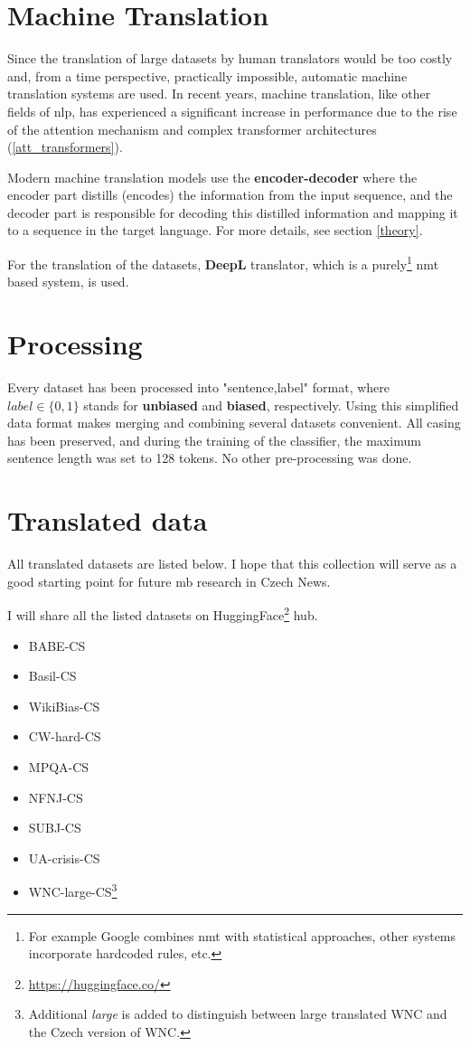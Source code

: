  
 
\section{Machine Translation}\label{DeepL}
Since the translation of large datasets by human translators would be too costly and, from a time perspective, practically impossible, automatic machine translation systems are used. In recent years, machine translation, like other fields of \Gls{nlp}, has experienced a significant increase in performance due to the rise of the attention mechanism and complex transformer architectures (\ref{att_transformers}).

Modern machine translation models use the \textbf{encoder-decoder} where the encoder part distills (encodes) the information from the input sequence, and the decoder part is responsible for decoding this distilled information and mapping it to a sequence in the target language. For more details, see section \ref{theory}.

For the translation of the datasets, \textbf{DeepL} translator, which is a purely\footnote{For example Google combines \Gls{nmt} with statistical approaches, other systems incorporate hardcoded rules, etc.} \Gls{nmt} based system, is used.






\section{Processing}\label{processing}
Every dataset has been processed into "sentence,label" format, where $label \in \{0,1\}$ stands for \textbf{unbiased} and \textbf{biased}, respectively. Using this simplified data format makes merging and combining several datasets convenient. All casing has been preserved, and during the training of the classifier, the maximum sentence length was set to 128 tokens. No other pre-processing was done.

\section{Translated data}
All translated datasets are listed below. I hope that this collection will serve as a good starting point for future \gls{mb} research in Czech News.

I will share all the listed datasets on HuggingFace\footnote{\url{https://huggingface.co/}} hub.

\begin{itemize}
    \item BABE-CS
    \item Basil-CS
    \item WikiBias-CS
    \item CW-hard-CS
    \item MPQA-CS
    \item NFNJ-CS
    \item SUBJ-CS
    \item UA-crisis-CS
    \item WNC-large-CS\footnote{Additional \textit{large} is added to distinguish between large translated WNC and the Czech version of WNC.}
\end{itemize}

